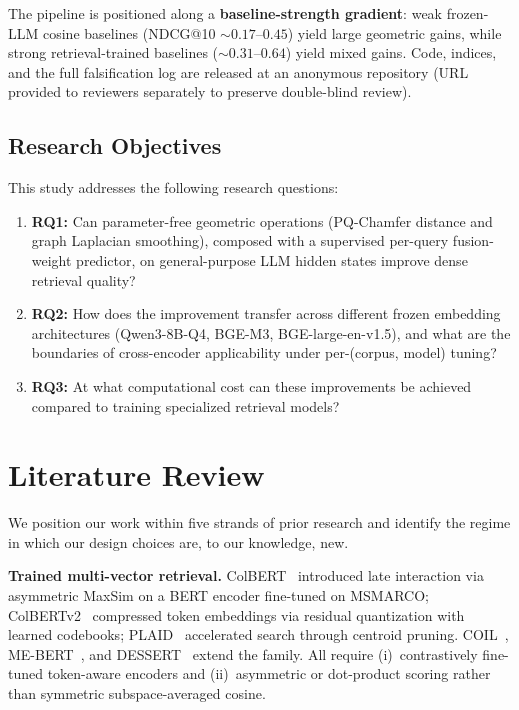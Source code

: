 \documentclass[review,1p]{elsarticle}
\begin{document}
The pipeline is positioned along a \textbf{baseline-strength gradient}: weak frozen-LLM cosine baselines (NDCG@10 $\sim 0.17$--$0.45$) yield large geometric gains, while strong retrieval-trained baselines ($\sim 0.31$--$0.64$) yield mixed gains. Code, indices, and the full falsification log are released at an anonymous repository (URL provided to reviewers separately to preserve double-blind review).

\subsection{Research Objectives}
\label{subsec:research-objectives}

This study addresses the following research questions:
\begin{enumerate}
\item \textbf{RQ1:} Can parameter-free geometric operations (PQ-Chamfer distance and graph Laplacian smoothing), composed with a supervised per-query fusion-weight predictor, on general-purpose LLM hidden states improve dense retrieval quality?
\item \textbf{RQ2:} How does the improvement transfer across different frozen embedding architectures (Qwen3-8B-Q4, BGE-M3, BGE-large-en-v1.5), and what are the boundaries of cross-encoder applicability under per-(corpus, model) tuning?
\item \textbf{RQ3:} At what computational cost can these improvements be achieved compared to training specialized retrieval models?
\end{enumerate}

\section{Literature Review}
\label{sec:related}

We position our work within five strands of prior research and identify the regime in which our design choices are, to our knowledge, new.

\textbf{Trained multi-vector retrieval.} ColBERT~\citep{khattab2020colbert} introduced late interaction via asymmetric MaxSim on a BERT encoder fine-tuned on MSMARCO; ColBERTv2~\citep{santhanam2022colbertv2} compressed token embeddings via residual quantization with learned codebooks; PLAID~\citep{santhanam2022plaid} accelerated search through centroid pruning. COIL~\citep{gao2021coil}, ME-BERT~\citep{luan2021mebert}, and DESSERT~\citep{engels2024dessert} extend the family. All require (i)~contrastively fine-tuned token-aware encoders and (ii)~asymmetric or dot-product scoring rather than symmetric subspace-averaged cosine.
\end{document}
